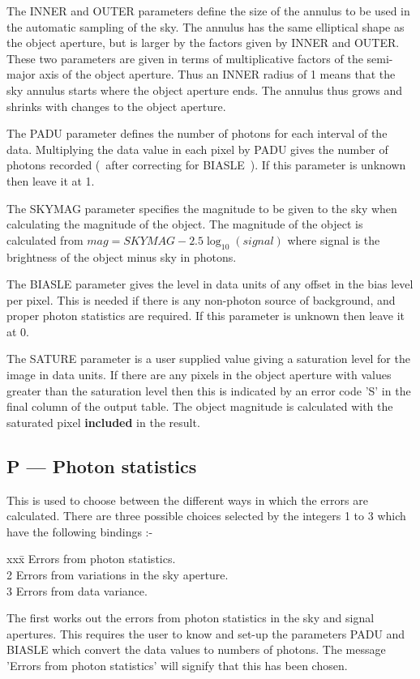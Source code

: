 The INNER and OUTER parameters define the size of the annulus to be
used in the automatic sampling of the sky. The annulus has the same
elliptical shape as the object aperture, but is larger by the factors
given by INNER and OUTER. These two parameters are given in terms of
multiplicative factors of the semi-major axis of the object aperture.
Thus an INNER radius of 1 means that the sky annulus starts where the
object aperture ends. The annulus thus grows and shrinks with changes
to the object aperture.

The PADU parameter defines the number of photons for each interval of
the data. Multiplying the data value in each pixel by PADU gives the
number of photons recorded (~after correcting for BIASLE~). If this
parameter is unknown then leave it at 1.

The SKYMAG parameter specifies the magnitude to be given to the sky
when calculating the magnitude of the object. The magnitude of the
object is calculated from
$mag = SKYMAG - 2.5 \log_{10} ( signal )$
where signal is the brightness of the object minus sky in photons.

The BIASLE parameter gives the level in data units of any offset in
the bias level per pixel. This is needed if there is any non-photon
source of background, and proper photon statistics are required. If
this parameter is unknown then leave it at 0.

The SATURE parameter is a user supplied value giving a saturation
level for the image in data units. If there are any pixels in the
object aperture with values greater than the saturation level then
this is indicated by an error code 'S' in the final column of the
output table. The object magnitude is calculated with the saturated
pixel {\bf included} in the result.

\subsection{P --- Photon statistics}

This is used to choose between the different ways in which the errors
are calculated. There are three possible choices selected by the integers
1 to 3 which have the following bindings :-
\begin{tabbing}
xxx\=  \> Errors from photon statistics. \\
2 \> Errors from variations in the sky aperture. \\
3 \> Errors from data variance. \\
\end{tabbing}
The first works out the errors from photon statistics in the sky and
signal apertures. This requires the user to know and set-up the
parameters PADU and BIASLE which convert the data values to numbers of
photons. The message 'Errors from photon statistics' will signify that
this has been chosen.

